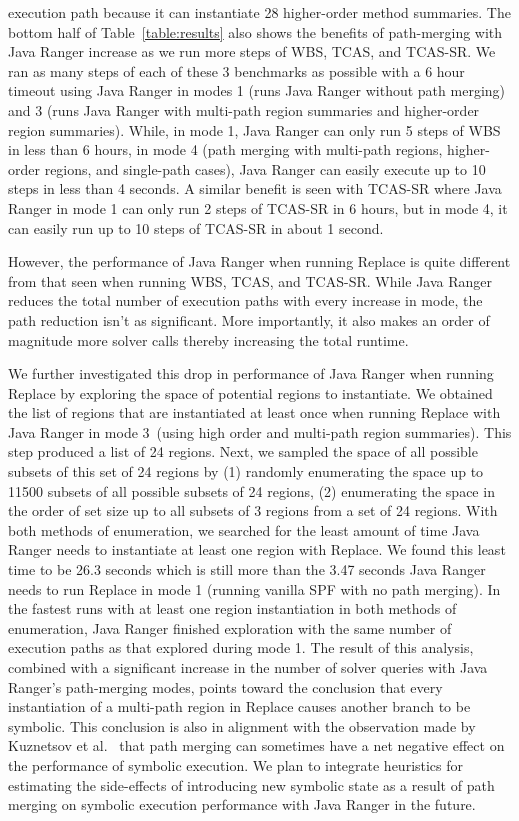 execution path because it can instantiate 28 higher-order method summaries.
%
The bottom half of Table~\ref{table:results} also shows the benefits of path-merging with Java Ranger increase as we run
more steps of WBS, TCAS, and TCAS-SR.
%
We ran as many steps of each of these 3 benchmarks as possible with a 6 hour timeout using Java Ranger in modes
1 (runs Java Ranger without path merging) and 3 (runs Java Ranger with multi-path region summaries and higher-order region summaries).
%
While, in mode 1, Java Ranger can only run 5 steps of WBS in less than 6 hours, in mode 4 (path merging with multi-path regions, higher-order regions, and single-path cases),
Java Ranger can easily execute up to 10 steps in less than 4 seconds.
%
A similar benefit is seen with TCAS-SR where Java Ranger in mode 1 can only run 2 steps of TCAS-SR in 6 hours, but in
mode 4, it can easily run up to 10 steps of TCAS-SR in about 1 second.

However, the performance of Java Ranger when running Replace is quite different from that seen when running WBS, TCAS, and TCAS-SR.
%
While Java Ranger reduces the total number of execution paths with every increase in mode, the path reduction isn't as significant.
%
More importantly, it also makes an order of magnitude more solver calls thereby increasing the total runtime.

We further investigated this drop in performance of Java Ranger when running Replace by exploring the space of potential
regions to instantiate.
%
We obtained the list of regions that are instantiated at least once when running Replace with Java Ranger in mode 3~(using
high order and multi-path region summaries).
%
This step produced a list of 24 regions.
%
Next, we sampled the space of all possible subsets of this set of 24 regions by
%
(1) randomly enumerating the space up to 11500 subsets of all possible subsets of 24 regions,
%
(2) enumerating the space in the order of set size up to all subsets of 3 regions from a set of 24 regions.
%
With both methods of enumeration, we searched for the least amount of time Java Ranger needs to instantiate at least one
region with Replace.
%
We found this least time to be 26.3 seconds which is still more than the 3.47 seconds Java Ranger needs to run
Replace in mode 1 (running vanilla SPF with no path merging).
%
In the fastest runs with at least one region instantiation in both methods of enumeration, Java Ranger finished
exploration with the same number of execution paths as that explored during mode 1.
%
The result of this analysis, combined with a significant increase in the number of solver queries with Java Ranger's
path-merging modes, points toward the conclusion that every instantiation of a multi-path region in Replace causes another branch to be
symbolic.
%
This conclusion is also in alignment with the observation made by Kuznetsov et al.~\cite{kuznetsov} that path merging can
sometimes have a net negative effect on the performance of symbolic execution.
%
We plan to integrate heuristics for estimating the side-effects of introducing new symbolic state as a result of
path merging on symbolic execution performance with Java Ranger in the future.
